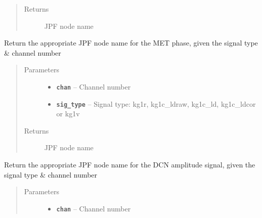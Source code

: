 \documentclass[letterpaper,10pt,english]{sphinxmanual}
\begin{document}
\begin{fulllineitems}
\begin{fulllineitems}
\begin{quote}
\begin{description}
\begin{itemize}
\end{itemize}

\item[{Returns}] \leavevmode
JPF node name

\end{description}\end{quote}

\end{fulllineitems}


\begin{fulllineitems}
\label{consts:consts.Consts.get_phase_node_met}
Return the appropriate JPF node name for the MET phase, given the signal type \& channel number
\begin{quote}\begin{description}
\item[{Parameters}] \leavevmode\begin{itemize}
\item {} 
\textbf{\texttt{chan}} -- Channel number

\item {} 
\textbf{\texttt{sig\_type}} -- Signal type: kg1r, kg1c\_ldraw, kg1c\_ld, kg1c\_ldcor or kg1v

\end{itemize}

\item[{Returns}] \leavevmode
JPF node name

\end{description}\end{quote}

\end{fulllineitems}


\begin{fulllineitems}
\label{consts:consts.Consts.get_amp_node_dcn}
Return the appropriate JPF node name for the DCN amplitude signal, given the signal type \& channel number
\begin{quote}\begin{description}
\item[{Parameters}] \leavevmode\begin{itemize}
\item {} 
\textbf{\texttt{chan}} -- Channel number


\end{itemize}
\end{description}
\end{quote}
\end{fulllineitems}
\end{fulllineitems}
\end{document}
